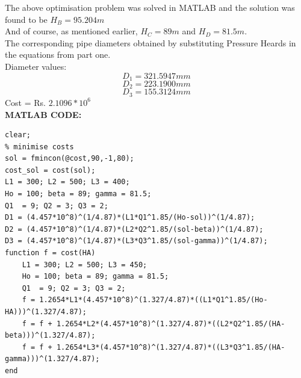 \documentclass{homework}
\begin{document}
The above optimisation problem was solved in MATLAB and the solution was found to be $H_B = 95.204m$ \\ And of course, as mentioned earlier, $H_C = 89m$ and $H_D = 81.5m$. \\
The corresponding pipe diameters obtained by substituting Pressure Heards in the equations from part one. \\
Diameter values:
\[D_1 = 321.5947 mm\]
\[D_2 = 223.1900 mm\]
\[D_3 = 155.3124 mm\]
Cost = Rs. $2.1096 * 10^6$\\
\textbf{MATLAB CODE:}
    \begin{verbatim}
clear;
% minimise costs
sol = fmincon(@cost,90,-1,80);
cost_sol = cost(sol);
L1 = 300; L2 = 500; L3 = 400;
Ho = 100; beta = 89; gamma = 81.5;
Q1  = 9; Q2 = 3; Q3 = 2;
D1 = (4.457*10^8)^(1/4.87)*(L1*Q1^1.85/(Ho-sol))^(1/4.87);
D2 = (4.457*10^8)^(1/4.87)*(L2*Q2^1.85/(sol-beta))^(1/4.87);
D3 = (4.457*10^8)^(1/4.87)*(L3*Q3^1.85/(sol-gamma))^(1/4.87);
function f = cost(HA)
    L1 = 300; L2 = 500; L3 = 450;
    Ho = 100; beta = 89; gamma = 81.5;
    Q1  = 9; Q2 = 3; Q3 = 2;
    f = 1.2654*L1*(4.457*10^8)^(1.327/4.87)*((L1*Q1^1.85/(Ho-HA)))^(1.327/4.87);
    f = f + 1.2654*L2*(4.457*10^8)^(1.327/4.87)*((L2*Q2^1.85/(HA-beta)))^(1.327/4.87);
    f = f + 1.2654*L3*(4.457*10^8)^(1.327/4.87)*((L3*Q3^1.85/(HA-gamma)))^(1.327/4.87);
end
\end{verbatim}
\end{document}
